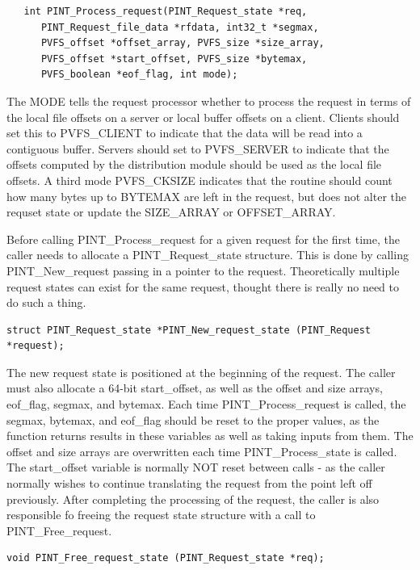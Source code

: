 \documentclass[12pt]{article} %
\begin{document}
\begin{verbatim}
   int PINT_Process_request(PINT_Request_state *req,
      PINT_Request_file_data *rfdata, int32_t *segmax,
      PVFS_offset *offset_array, PVFS_size *size_array,
      PVFS_offset *start_offset, PVFS_size *bytemax,
      PVFS_boolean *eof_flag, int mode);
\end{verbatim}

The MODE tells the request processor whether to process the
request in terms of the local file offsets on a server or local buffer
offsets on a client.  Clients should set this to PVFS\_CLIENT to
indicate that the data will be read into a contiguous buffer.  Servers
should set to PVFS\_SERVER to indicate that the offsets computed by the
distribution module should be used as the local file offsets.
A third mode PVFS\_CKSIZE indicates that the routine should count how
many bytes up to BYTEMAX are left in the request, but does not alter the
requset state or update the SIZE\_ARRAY or OFFSET\_ARRAY.

Before calling PINT\_Process\_request for a given request for the first
time, the caller needs to allocate a PINT\_Request\_state structure.
This is done by calling PINT\_New\_request passing in a pointer to the
request.  Theoretically multiple request states can exist for the same
request, thought there is really no need to do such a thing.

\begin{verbatim}
struct PINT_Request_state *PINT_New_request_state (PINT_Request *request);
\end{verbatim}

The new request state is positioned at the beginning of the request.
The caller must also allocate a 64-bit start\_offset, as well as
the offset and size arrays, eof\_flag, segmax, and bytemax.  Each time
PINT\_Process\_request is called, the segmax, bytemax, and eof\_flag
should be reset to the proper values, as the function returns results in
these variables as well as taking inputs from them.  The offset and size
arrays are overwritten each time PINT\_Process\_state is called.  The
start\_offset variable is normally NOT reset between calls - as the
caller normally wishes to continue translating the request from the
point left off previously.  After completing the processing of the
request, the caller is also responsible fo freeing the request state
structure with a call to PINT\_Free\_request.

\begin{verbatim}
void PINT_Free_request_state (PINT_Request_state *req);
\end{verbatim}
\end{document}
